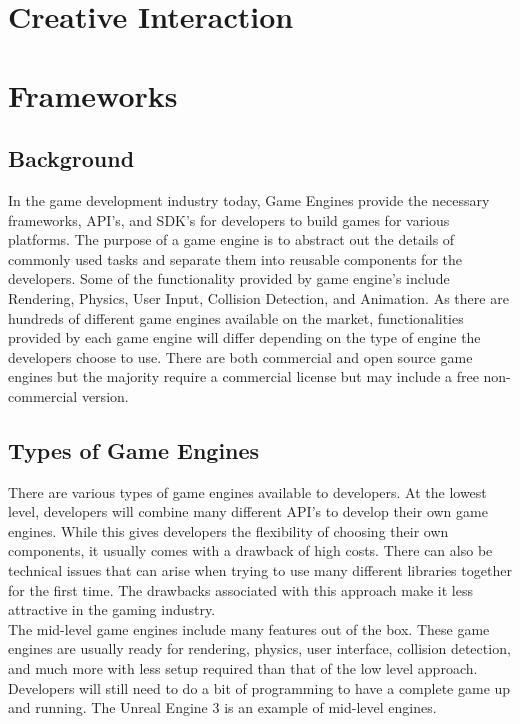 \section{Creative Interaction}

\section{Frameworks}

\subsection{Background}
In the game development industry today, Game Engines provide the necessary frameworks, API's, and SDK's for developers to build games for various platforms. The purpose of a game engine is to abstract out the details of commonly used tasks and separate them into reusable components for the developers. Some of the functionality provided by game engine's include Rendering, Physics, User Input, Collision Detection, and Animation. As there are hundreds of different game engines available on the market, functionalities provided by each game engine will differ depending on the type of engine the developers choose to use. There are both commercial and open source game engines but the majority require a commercial license but may include a free non-commercial version.

\subsection{Types of Game Engines}
There are various types of game engines available to developers. At the lowest level, developers will combine many different API's to develop their own game engines. While this gives developers the flexibility of choosing their own components, it usually comes with a drawback of high costs. There can also be technical issues that can arise when trying to use many different libraries together for the first time. The drawbacks associated with this approach make it less attractive in the gaming industry.\\

The mid-level game engines include many features out of the box. These game engines are usually ready for rendering, physics, user interface, collision detection, and much more with less setup required than that of the low level approach. Developers will still need to do a bit of programming to have a complete game up and running. The Unreal Engine 3 is an example of mid-level engines.\\

